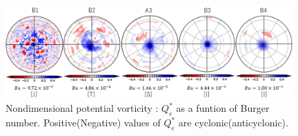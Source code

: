 \documentclass[a4j,multicol,8pt]{jarticle}
\begin{document}
\begin{figure}[b]
  \begin{center}
  \includegraphics[width=11cm]{./fig/case1_nonqv_a.png}
  \caption{\footnotesize{Nondimensional potential vorticity : $Q_e^*$ as a funtion of Burger number.
Positive(Negative) values of $Q_e^*$ are cyclonic(anticyclonic).
}}
  \label{case1:nonqv_a}
  \end{center}
\end{figure}
\end{document}

